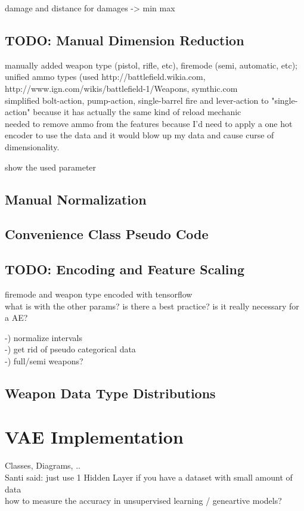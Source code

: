 \documentclass[MGS,Master,english]{twbook}%
\begin{document}
damage and distance for damages -> min max

\subsection{TODO: Manual Dimension Reduction}
manually added weapon type (pistol, rifle, etc), firemode (semi, automatic, etc); unified ammo types (used http://battlefield.wikia.com, http://www.ign.com/wikis/battlefield-1/Weapons, symthic.com\\
simplified bolt-action, pump-action, single-barrel fire and lever-action to "single-action" because it has actually the same kind of reload mechanic\\
needed to remove ammo from the features because I'd need to apply a one hot encoder to use the data and it would blow up my data and cause curse of dimensionality.

show the used parameter 

\subsection{Manual Normalization}

\subsection{Convenience Class Pseudo Code}


\subsection{TODO: Encoding and Feature Scaling}
firemode and weapon type encoded with tensorflow\\
what is with the other params? is there a best practice? is it really necessary for a AE? 

-) normalize intervals\\
-) get rid of pseudo categorical data \\
-) full/semi weapons?

\subsection{Weapon Data Type Distributions}

\section{VAE Implementation}
Classes, Diagrams, ..\\
Santi said: just use 1 Hidden Layer if you have a dataset with small amount of data\\
how to measure the accuracy in unsupervised learning / geneartive models?
\end{document}

